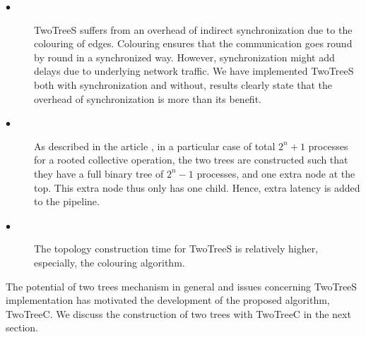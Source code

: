 \documentclass[sigplan,review,anonymous]{acmart}\settopmatter{printfolios=true,printccs=false,printacmref=false}
\begin{document}
\begin{description}
    \item[$\bullet$]TwoTreeS suffers from an overhead of indirect synchronization due to the colouring of edges. Colouring ensures that the communication goes round by round in a synchronized way. However, synchronization might add delays due to underlying network traffic. We have implemented TwoTreeS both with synchronization and without, results clearly state that the overhead of synchronization is more than its benefit.
    \item[$\bullet$]As described in the article \cite{sanders_two-tree_2009}, in a particular case of total \(2^n+1\) processes for a rooted collective operation, the two trees are constructed such that they have a full binary tree of \(2^n-1\) processes, and one extra node at the top. This extra node thus only has one child. Hence, extra latency is added to the pipeline.
    \item[$\bullet$]The topology construction time for TwoTreeS is relatively higher, especially, the colouring algorithm.
\end{description}

The potential of two trees mechanism in general and issues concerning TwoTreeS implementation has motivated the development of the proposed algorithm, TwoTreeC. We discuss the construction of two trees with TwoTreeC in the next section.

% 
% 
\end{document}
